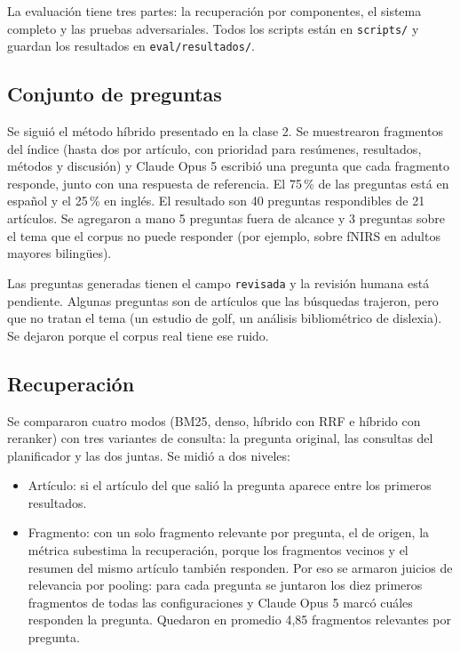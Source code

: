 La evaluación tiene tres partes: la recuperación por componentes, el sistema completo y las pruebas
adversariales. Todos los scripts están en \texttt{scripts/} y guardan los resultados en
\texttt{eval/resultados/}.

\subsection{Conjunto de preguntas}

Se siguió el método híbrido presentado en la clase 2. Se muestrearon fragmentos del índice (hasta dos
por artículo, con prioridad para resúmenes, resultados, métodos y discusión) y Claude Opus 5 escribió
una pregunta que cada fragmento responde, junto con una respuesta de referencia. El 75\,\% de las
preguntas está en español y el 25\,\% en inglés. El resultado son 40 preguntas respondibles de 21
artículos. Se agregaron a mano 5 preguntas fuera de alcance y 3 preguntas sobre el tema que el corpus
no puede responder (por ejemplo, sobre fNIRS en adultos mayores bilingües).

Las preguntas generadas tienen el campo \texttt{revisada} y la revisión humana está pendiente.
Algunas preguntas son de artículos que las búsquedas trajeron, pero que no tratan el tema (un estudio
de golf, un análisis bibliométrico de dislexia). Se dejaron porque el corpus real tiene ese ruido.

\subsection{Recuperación}

Se compararon cuatro modos (BM25, denso, híbrido con RRF e híbrido con reranker) con tres variantes
de consulta: la pregunta original, las consultas del planificador y las dos juntas. Se midió a dos
niveles:

\begin{itemize}
\item Artículo: si el artículo del que salió la pregunta aparece entre los primeros resultados.
\item Fragmento: con un solo fragmento relevante por pregunta, el de origen, la métrica subestima la
recuperación, porque los fragmentos vecinos y el resumen del mismo artículo también responden. Por
eso se armaron juicios de relevancia por pooling: para cada pregunta se juntaron los diez primeros
fragmentos de todas las configuraciones y Claude Opus 5 marcó cuáles responden la pregunta. Quedaron
en promedio 4,85 fragmentos relevantes por pregunta.
\end{itemize}

